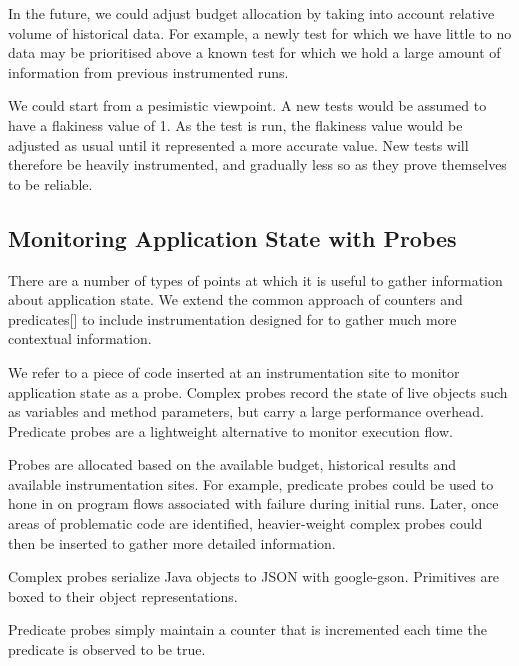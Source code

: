{In the future, we could adjust \flaky budget allocation by taking into account
relative volume of historical data. For example, a newly \flaky test for which
we have little to no data may be prioritised above a known \flaky test for which
we hold a large amount of information from previous instrumented runs.

We could start from a pesimistic viewpoint. A new tests would be assumed to have
a flakiness value of 1. As the test is run, the flakiness value would be
adjusted as usual until it represented a more accurate value. New tests will
therefore be heavily instrumented, and gradually less so as they prove
themselves to be reliable.

\subsection{Monitoring Application State with Probes}
\label{sec:probes}

There are a number of types of points at which it is useful to gather
information about application state. We extend the common approach of counters
and predicates[] to include instrumentation designed for to gather much more
contextual information.

We refer to a piece of code inserted at an instrumentation site to monitor
application state as a probe. Complex probes record the state of live objects
such as variables and method parameters, but carry a large performance overhead.
Predicate probes are a lightweight alternative to monitor execution flow.

Probes are allocated based on the available budget, historical results and
available instrumentation sites. For example, predicate probes could be used to
hone in on program flows associated with failure during initial runs. Later,
once areas of problematic code are identified, heavier-weight complex probes
could then be inserted to gather more detailed information.

Complex probes serialize Java objects to JSON with google-gson. Primitives are
boxed to their object representations.

Predicate probes simply maintain a counter that is incremented each time the
predicate is observed to be true.

}
